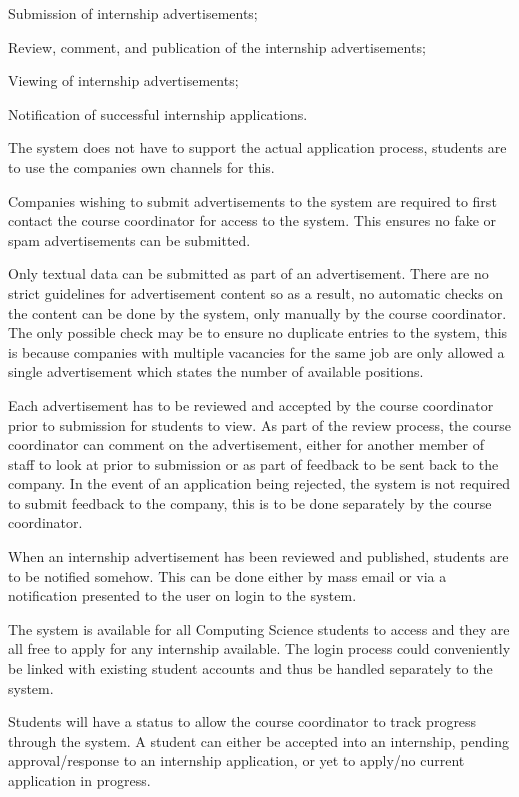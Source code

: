 \documentclass{l3deliverable}
\begin{document}
Submission of internship advertisements;

Review, comment, and publication of the internship advertisements;

Viewing of internship advertisements;

Notification of successful internship applications.

The system does not have to support the actual application process, students
are to use the companies own channels for this.

Companies wishing to submit advertisements to the system are required to first
contact the course coordinator for access to the system. This ensures no fake
or spam advertisements can be submitted.

Only textual data can be submitted as part of an advertisement. There are no
strict guidelines for advertisement content so as a result, no automatic checks
on the content can be done by the system, only manually by the course
coordinator. The only possible check may be to ensure no duplicate entries
to the system, this is because companies with multiple vacancies for the same
job are only allowed a single advertisement which states the number of
available positions.

Each advertisement has to be reviewed and accepted by the course coordinator
prior to submission for students to view. As part of the review process, the
course coordinator can comment on the advertisement, either for another member
of staff to look at prior to submission or as part of feedback to be sent back
to the company. In the event of an application being rejected, the system is
not required to submit feedback to the company, this is to be done separately
by the course coordinator.

When an internship advertisement has been reviewed and published, students 
are to be notified somehow. This can be done either by mass email or via a 
notification presented to the user on login to the system.

The system is available for all Computing Science students to access and 
they are all free to apply for any internship available. The login process could
conveniently be linked with existing student accounts and thus be handled separately
to the system.

Students will have a status to allow the course coordinator to track progress
through the system. A student can either be accepted into an internship, pending
approval/response to an internship application, or yet to apply/no current 
application in progress.
\end{document}
